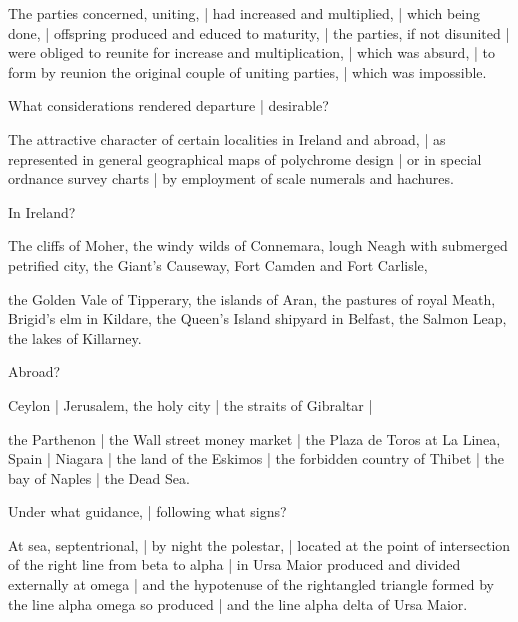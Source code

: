 \Religious
The parties concerned, uniting, |
had increased and multiplied, |
which being done, |
offspring produced and educed to maturity, |
the parties,
if not disunited |
were obliged to reunite for increase and multiplication, |
which was absurd, |
to form by reunion the original couple of uniting parties, |
which was impossible.


What considerations rendered departure |
desirable?

\Science
The attractive character of certain localities in Ireland and abroad, |
as represented in general geographical maps of polychrome design |
or in special ordnance survey charts |
by employment of scale numerals and hachures.


In Ireland?

\Places
The cliffs of Moher,
the windy wilds of Connemara,
lough Neagh with submerged petrified city,
the Giant's Causeway,
Fort Camden and Fort Carlisle,

\Poetry
the Golden Vale of Tipperary,
the islands of Aran,
the pastures of royal Meath,
Brigid's elm in Kildare,
the Queen's Island shipyard in Belfast,
the Salmon Leap,
the lakes of Killarney.


Abroad?

\Places
Ceylon
 |
Jerusalem, the holy city
 |
the straits of Gibraltar
 |

\Poetry
the Parthenon
 |
the Wall street money market
 |
the Plaza de Toros at La Linea, Spain
 |
Niagara
 |
the land of the Eskimos
 |
the forbidden country of Thibet
 |
the bay of Naples
 |
the Dead Sea.


Under what guidance, |
following what signs?

\Science
At sea, septentrional, |
by night the polestar, |
located at the point of intersection of the right line from beta to alpha |
in Ursa Maior produced and divided externally at omega |
and the hypotenuse of the rightangled triangle
formed by the line alpha omega so produced |
and the line alpha delta of Ursa Maior.

